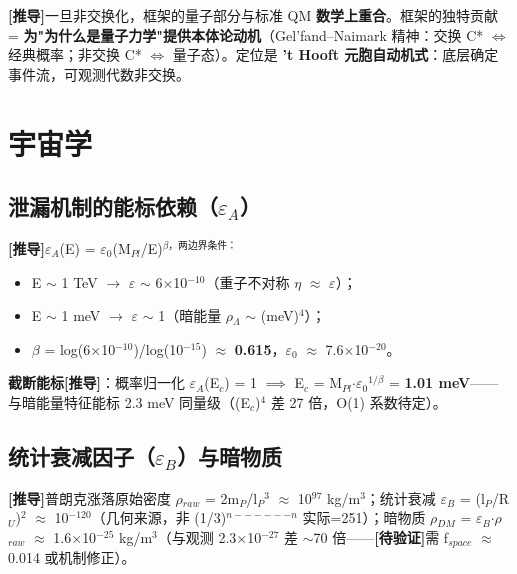 \documentclass[UTF8,fontset=windows]{csoarticle}
\newcommand{\mtag}[1]{\textbf{[#1]}}
\newcommand{\up}[1]{\ensuremath{^{#1}}}
\newcommand{\down}[1]{\ensuremath{_{#1}}}
\begin{document}
\mtag{推导}一旦非交换化，框架的量子部分与标准 QM \textbf{数学上重合}。框架的独特贡献 = \textbf{为"为什么是量子力学"提供本体论动机}（Gel'fand--Naimark 精神：交换 C* \ensuremath{\iff} 经典概率；非交换 C* \ensuremath{\iff} 量子态）。定位是 \textbf{'t Hooft 元胞自动机式}：底层确定事件流，可观测代数非交换。



\section{宇宙学}

\subsection{泄漏机制的能标依赖（\ensuremath{\varepsilon}\down{A}）}

\mtag{推导}\ensuremath{\varepsilon}\down{A}(E) = \ensuremath{\varepsilon}\down{0}(M\down{Pl}/E)\up{\beta{}，两边界条件：}
\begin{itemize}
\item E \ensuremath{\sim} 1 TeV \ensuremath{\to} \ensuremath{\varepsilon} \ensuremath{\sim} 6\ensuremath{\times}10\up{-10}（重子不对称 \ensuremath{\eta} \ensuremath{\approx} \ensuremath{\varepsilon}）；
\item E \ensuremath{\sim} 1 meV \ensuremath{\to} \ensuremath{\varepsilon} \ensuremath{\sim} 1（暗能量 \ensuremath{\rho}\down{\Lambda{}} \ensuremath{\sim} (meV)\up{4}）；
\item \ensuremath{\beta} = log(6\ensuremath{\times}10\up{-10})/log(10\up{-15}) \ensuremath{\approx} \textbf{0.615}，\ensuremath{\varepsilon}\down{0} \ensuremath{\approx} 7.6\ensuremath{\times}10\up{-20}。
\end{itemize}

\textbf{截断能标}\mtag{推导}：概率归一化 \ensuremath{\varepsilon}\down{A}(E\down{c}) = 1 \ensuremath{\implies} E\down{c} = M\down{Pl}\ensuremath{\cdot}\ensuremath{\varepsilon}\down{0}\up{1/\beta{}} = \textbf{1.01 meV}------与暗能量特征能标 2.3 meV 同量级（(E\down{c})\up{4} 差 27 倍，O(1) 系数待定）。

\subsection{统计衰减因子（\ensuremath{\varepsilon}\down{B}）与暗物质}

\mtag{推导}普朗克涨落原始密度 \ensuremath{\rho}\down{raw} = 2m\down{P}/l\down{P}\up{3} \ensuremath{\approx} 10\up{97} kg/m\up{3}；统计衰减 \ensuremath{\varepsilon}\down{B} = (l\down{P}/R\down{U})\up{2} \ensuremath{\approx} 10\up{-120}（几何来源，非 (1/3)\up{n------n} 实际=251）；暗物质 \ensuremath{\rho}\down{DM} = \ensuremath{\varepsilon}\down{B}\ensuremath{\cdot}\ensuremath{\rho}\down{raw} \ensuremath{\approx} 1.6\ensuremath{\times}10\up{-25} kg/m\up{3}（与观测 2.3\ensuremath{\times}10\up{-27} 差 \ensuremath{\sim}70 倍------\textbf{\mtag{待验证}}需 f\down{space} \ensuremath{\approx} 0.014 或机制修正）。
\end{document}
